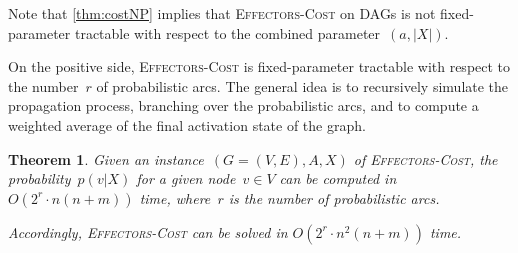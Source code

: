 \documentclass{article}
\newtheorem{theorem}{Theorem}
\newcommand{\probCost}{\textsc{Effectors-Cost}\xspace}
\begin{document}
Note that \autoref{thm:costNP} implies that \probCost on DAGs is not fixed-parameter tractable
with respect to the combined parameter~$(a,|X|)$.

On the positive side, \probCost is fixed-parameter tractable with respect to the
number~$r$ of probabilistic arcs.
The general idea is to recursively simulate the propagation process,
branching over the probabilistic arcs,
and to compute a weighted average of the final activation state of the graph.

\begin{theorem}\label{thm:costFPTr}
  Given an instance~$(G=(V,E),A,X)$ of \probCost, the probability~$p(v|X)$ for a given node~$v\in V$ can be computed in~$O(2^r \cdot n (n + m))$ time, where~$r$ is the number of probabilistic arcs.

  Accordingly, \probCost can be solved in $O(2^r \cdot n^2 (n + m))$ time.
\end{theorem}
\end{document}
